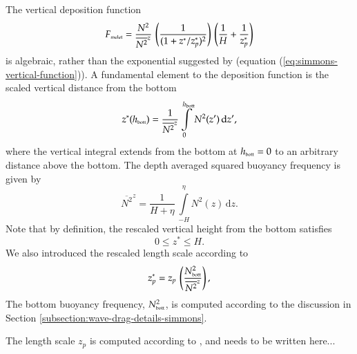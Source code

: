 The vertical deposition function
\begin{equation}
 F_{\mbox{\tiny melet}} = \frac{N^{2}}{ \overline{N^{2}}^{z}} 
 \, \left( \frac{1}{ (1 + z^{*}/z_{p}^{*})^{2}} \right)
 \, \left( \frac{1}{H} + \frac{1}{z_{p}^{*}} \right)
\end{equation}
is algebraic, rather than the exponential suggested by
\cite{Simmonsetal2004} (equation
(\ref{eq:simmons-vertical-function})).  A fundamental element to the
deposition function is the scaled vertical distance from the bottom
\begin{equation}
 z^{*}( h_{\mbox{\tiny bott}}) = 
 \frac{1}{\overline{N^{2}}^{z}}
 \int\limits_{0}^{ h_{\mbox{\tiny bott}}} N^{2}(z')  \, \mathrm{d}z',
\end{equation}
where the vertical integral extends from the bottom at $h_{\mbox{\tiny
    bott}} = 0$ to an arbitrary distance above the bottom.  The depth
averaged squared buoyancy frequency is given by
\begin{equation}
 \overline{N^{2}}^{z} = \frac{1}{H + \eta} \, \int\limits_{-H}^{\eta} N^{2}(z) \, \mathrm{d}z. 
\end{equation}
Note that by definition, the rescaled vertical height from the bottom
satisfies
\begin{equation}
  0 \le z^{*} \le H.
\end{equation}
We also introduced the rescaled length scale according to 
\begin{equation}
 z_{p}^{*}  = z_{p} \, \left( \frac{N^{2}_{\mbox{\tiny bott}}}{ \overline{N^{2}}^{z}} \right),
\end{equation}
The bottom buoyancy frequency, $N^{2}_{\mbox{\tiny bott}}$, is
computed according to the discussion in Section
\ref{subsection:wave-drag-details-simmons}.

The length scale $z_{p}$ is computed according to
\cite{Polzin2004,Polzin2009}, and needs to be written here...




